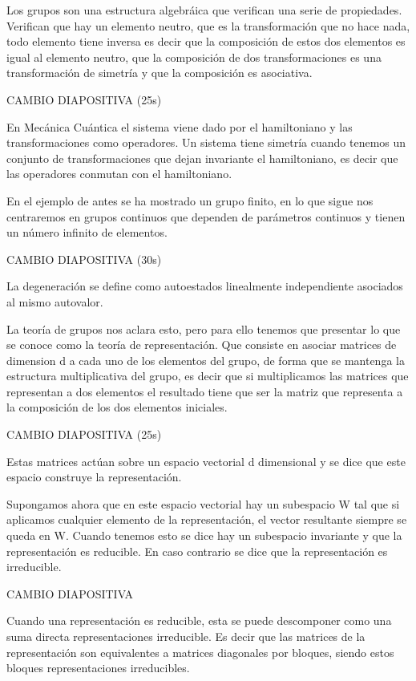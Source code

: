 \documentclass[a4paper,12pt,twoside]{article}
\begin{document}
Los grupos son una estructura algebráica que verifican una serie de propiedades. Verifican que hay un elemento neutro, que es la transformación que no hace nada, todo elemento tiene inversa es decir que la composición de estos dos elementos es igual al elemento neutro, que la composición de dos transformaciones es una transformación de simetría y que la composición es asociativa.

CAMBIO DIAPOSITIVA (25s)

En Mecánica Cuántica el sistema viene dado por el hamiltoniano y las transformaciones como operadores. Un sistema tiene simetría cuando tenemos un conjunto de transformaciones que dejan invariante el hamiltoniano, es decir que las operadores conmutan con el hamiltoniano. 

En el ejemplo de antes se ha mostrado un grupo finito, en lo que sigue nos centraremos en grupos continuos que dependen de parámetros continuos y tienen un número infinito de elementos.


CAMBIO DIAPOSITIVA (30s)

La degeneración se define como autoestados linealmente independiente asociados al mismo autovalor. 

La teoría de grupos nos aclara esto, pero para ello tenemos que presentar lo que se conoce como la teoría de representación. Que consiste en asociar matrices de dimension d a cada uno de los elementos del grupo, de forma que se mantenga la estructura multiplicativa del grupo, es decir que si multiplicamos las matrices que representan a dos elementos el resultado tiene que ser la matriz que representa a la composición de los dos elementos iniciales.

CAMBIO DIAPOSITIVA (25s)


Estas matrices actúan sobre un espacio vectorial d dimensional y se dice que este espacio construye la representación.

Supongamos ahora que en este espacio vectorial hay un subespacio W tal que si aplicamos cualquier elemento de la representación, el vector resultante siempre se queda en W. Cuando tenemos esto se dice hay un subespacio invariante y que la representación es reducible. En caso contrario se dice que la representación es irreducible. 

CAMBIO DIAPOSITIVA

Cuando una representación es reducible, esta se puede descomponer como una suma directa representaciones irreducible. Es decir que las matrices de la representación son equivalentes a matrices diagonales por bloques, siendo estos bloques representaciones irreducibles.
\end{document}
